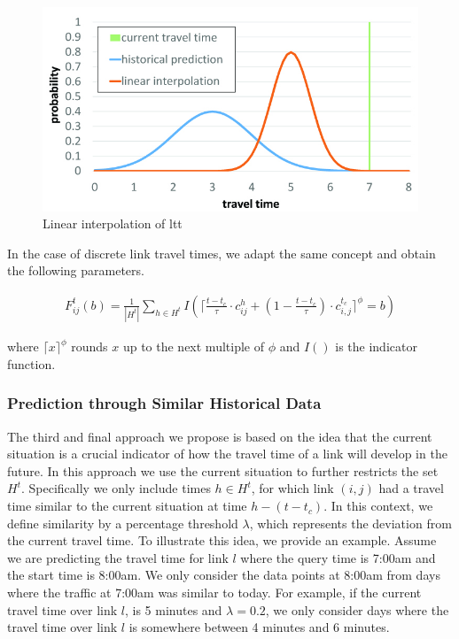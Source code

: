 \begin{figure}[h]
    \centering
    \includegraphics[width=0.80\columnwidth]{figures/tt_interpolation.jpg}
    \caption{Linear interpolation of ltt}
    \label{fig:interpolation}
\end{figure}

In the case of discrete link travel times, we adapt the same concept and obtain the following parameters.

\begin{gather}
F_{ij}^t(b) = \frac{1}{|H^t|}\sum_{h\in H^t} I(\lceil\frac{t - t_c}{\tau} \cdot 
c_{ij}^h + (1-\frac{t - t_c}{\tau})\cdot c_{i,j}^{t_c}\rceil^\phi = b)
\end{gather}

where $\lceil x \rceil^\phi$ rounds $x$ up to the next multiple of $\phi$ and $I()$ is the indicator function.

\subsubsection{Prediction through Similar Historical Data}
\label{subsec:SH}
The third and final approach we propose is based on the idea that the current situation is a crucial indicator of how the travel time of a link will develop in the future. In this approach we use the current situation to further restricts the set $H^t$. Specifically we only include times $h \in H^t$, for which link $(i, j)$ had a travel time similar to the current situation at time $h-(t-t_c)$. In this context, we define similarity by a percentage threshold $\lambda$, which represents the deviation from the current travel time.
To illustrate this idea, we provide an example. Assume we are predicting the travel time for link $l$ where the query time is 7:00am and the start time is 8:00am. We only consider the data points at 8:00am from days where the traffic at 7:00am was similar to today. For example, if the current travel time over link $l$, is 5 minutes and $\lambda = 0.2$, we only consider days where the travel time over link $l$ is somewhere between 4 minutes and 6 minutes.

